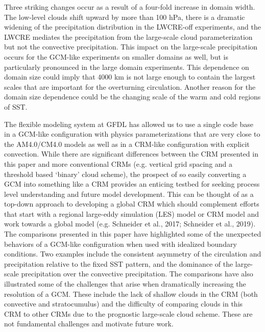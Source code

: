\documentclass[draft]{agujournal2019}
\begin{document}
{Three striking changes occur as a result of a four-fold increase in domain width.  The low-level clouds shift 
upward by more than 100 hPa, there is a dramatic widening of the precipitation distribution in the LWCRE-off experiments,  
and the LWCRE mediates the precipitation from the large-scale cloud parameterization but not the convective precipitation.    
This impact on the large-scale precipitation occurs for the GCM-like experiments on smaller domains as well, 
but is particularly pronounced in the large domain experiments.  
This dependence on domain size could imply that 4000 km is not large enough to contain the largest 
scales that are important for the overturning circulation.  Another reason for the domain 
size dependence could be the changing scale of the warm and cold regions of SST.  

The flexible modeling system at GFDL has allowed us to use a single code base in a GCM-like configuration with 
physics parameterizations that are very close to the AM4.0/CM4.0 models as well as in a CRM-like configuration 
with explicit convection.  While there are significant differences between the CRM presented in this paper and more 
conventional CRMs (e.g. vertical grid spacing and a threshold based `binary' cloud scheme), the prospect of so 
easily converting a GCM into something like a CRM provides an enticing testbed for seeking process level 
understanding and future model development.   This can be thought of as a top-down approach to developing 
a global CRM which should complement efforts that start with a regional large-eddy simulation (LES) model or CRM model and work 
towards a global model (e.g. Schneider et al., 2017; Schneider et al., 2019).
The comparisons presented in this paper have highlighted some of the unexpected behaviors of a GCM-like 
configuration when used with idealized boundary conditions.  
Two examples include the consistent asymmetry of the circulation and precipitation relative 
to the fixed SST pattern, and the dominance of the large-scale precipitation over the convective precipitation.  
The comparisons have also illustrated some of the challenges that arise when dramatically increasing the resolution of a GCM.  
These include the lack of shallow clouds in the CRM (both convective and stratocumulus) and the difficulty of comparing 
clouds in this CRM to other CRMs due to the prognostic large-scale cloud scheme.  
These are not fundamental challenges and motivate future work.  

}
\end{document}
